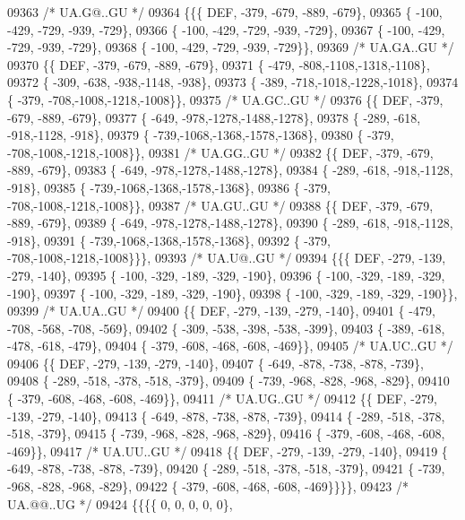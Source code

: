 \begin{DoxyCode}
09363 \textcolor{comment}{/* UA.G@..GU */}
09364 \{\{\{  DEF, -379, -679, -889, -679\},
09365 \{ -100, -429, -729, -939, -729\},
09366 \{ -100, -429, -729, -939, -729\},
09367 \{ -100, -429, -729, -939, -729\},
09368 \{ -100, -429, -729, -939, -729\}\},
09369 \textcolor{comment}{/* UA.GA..GU */}
09370 \{\{  DEF, -379, -679, -889, -679\},
09371 \{ -479, -808,-1108,-1318,-1108\},
09372 \{ -309, -638, -938,-1148, -938\},
09373 \{ -389, -718,-1018,-1228,-1018\},
09374 \{ -379, -708,-1008,-1218,-1008\}\},
09375 \textcolor{comment}{/* UA.GC..GU */}
09376 \{\{  DEF, -379, -679, -889, -679\},
09377 \{ -649, -978,-1278,-1488,-1278\},
09378 \{ -289, -618, -918,-1128, -918\},
09379 \{ -739,-1068,-1368,-1578,-1368\},
09380 \{ -379, -708,-1008,-1218,-1008\}\},
09381 \textcolor{comment}{/* UA.GG..GU */}
09382 \{\{  DEF, -379, -679, -889, -679\},
09383 \{ -649, -978,-1278,-1488,-1278\},
09384 \{ -289, -618, -918,-1128, -918\},
09385 \{ -739,-1068,-1368,-1578,-1368\},
09386 \{ -379, -708,-1008,-1218,-1008\}\},
09387 \textcolor{comment}{/* UA.GU..GU */}
09388 \{\{  DEF, -379, -679, -889, -679\},
09389 \{ -649, -978,-1278,-1488,-1278\},
09390 \{ -289, -618, -918,-1128, -918\},
09391 \{ -739,-1068,-1368,-1578,-1368\},
09392 \{ -379, -708,-1008,-1218,-1008\}\}\},
09393 \textcolor{comment}{/* UA.U@..GU */}
09394 \{\{\{  DEF, -279, -139, -279, -140\},
09395 \{ -100, -329, -189, -329, -190\},
09396 \{ -100, -329, -189, -329, -190\},
09397 \{ -100, -329, -189, -329, -190\},
09398 \{ -100, -329, -189, -329, -190\}\},
09399 \textcolor{comment}{/* UA.UA..GU */}
09400 \{\{  DEF, -279, -139, -279, -140\},
09401 \{ -479, -708, -568, -708, -569\},
09402 \{ -309, -538, -398, -538, -399\},
09403 \{ -389, -618, -478, -618, -479\},
09404 \{ -379, -608, -468, -608, -469\}\},
09405 \textcolor{comment}{/* UA.UC..GU */}
09406 \{\{  DEF, -279, -139, -279, -140\},
09407 \{ -649, -878, -738, -878, -739\},
09408 \{ -289, -518, -378, -518, -379\},
09409 \{ -739, -968, -828, -968, -829\},
09410 \{ -379, -608, -468, -608, -469\}\},
09411 \textcolor{comment}{/* UA.UG..GU */}
09412 \{\{  DEF, -279, -139, -279, -140\},
09413 \{ -649, -878, -738, -878, -739\},
09414 \{ -289, -518, -378, -518, -379\},
09415 \{ -739, -968, -828, -968, -829\},
09416 \{ -379, -608, -468, -608, -469\}\},
09417 \textcolor{comment}{/* UA.UU..GU */}
09418 \{\{  DEF, -279, -139, -279, -140\},
09419 \{ -649, -878, -738, -878, -739\},
09420 \{ -289, -518, -378, -518, -379\},
09421 \{ -739, -968, -828, -968, -829\},
09422 \{ -379, -608, -468, -608, -469\}\}\}\},
09423 \textcolor{comment}{/* UA.@@..UG */}
09424 \{\{\{\{    0,    0,    0,    0,    0\},

\end{DoxyCode}
